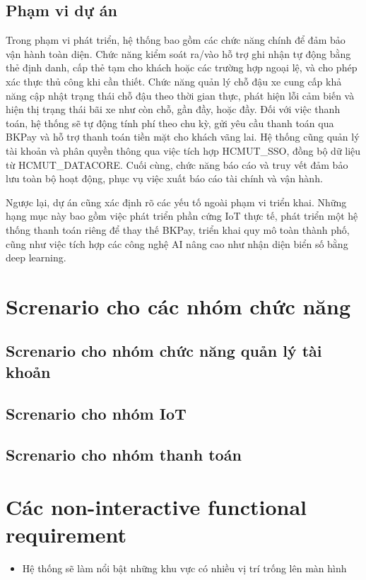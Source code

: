 \documentclass[a4paper,12pt]{article}
\begin{document}
\subsection{Phạm vi dự án}
Trong phạm vi phát triển, hệ thống bao gồm các chức năng chính để đảm bảo vận hành toàn diện. Chức năng kiểm soát ra/vào hỗ trợ ghi nhận tự động bằng thẻ định danh, cấp thẻ tạm cho khách hoặc các trường hợp ngoại lệ, và cho phép xác thực thủ công khi cần thiết. Chức năng quản lý chỗ đậu xe cung cấp khả năng cập nhật trạng thái chỗ đậu theo thời gian thực, phát hiện lỗi cảm biến và hiện thị trạng thái bãi xe như còn chỗ, gần đầy, hoặc đầy. Đối với việc thanh toán, hệ thống sẽ tự động tính phí theo chu kỳ, gửi yêu cầu thanh toán qua BKPay và hỗ trợ thanh toán tiền mặt cho khách vãng lai. Hệ thống cũng quản lý tài khoản và phân quyền thông qua việc tích hợp HCMUT\_SSO, đồng bộ dữ liệu từ HCMUT\_DATACORE. Cuối cùng, chức năng báo cáo và truy vết đảm bảo lưu toàn bộ hoạt động, phục vụ việc xuất báo cáo tài chính và vận hành.

Ngược lại, dự án cũng xác định rõ các yếu tố ngoài phạm vi triển khai. Những hạng mục này bao gồm việc phát triển phần cứng IoT thực tế, phát triển một hệ thống thanh toán riêng để thay thế BKPay, triển khai quy mô toàn thành phố, cũng như việc tích hợp các công nghệ AI nâng cao như nhận diện biển số bằng deep learning.

\section{Screnario cho các nhóm chức năng}
\subsection{Screnario cho nhóm chức năng quản lý tài khoản}


\subsection{Screnario cho nhóm IoT}


\subsection{Screnario cho nhóm thanh toán}


\section{Các non-interactive functional requirement}
\begin{itemize}
    \item Hệ thống sẽ làm nổi bật những khu vực có nhiều vị trí trống lên màn hình
\end{itemize} 
\end{document}
